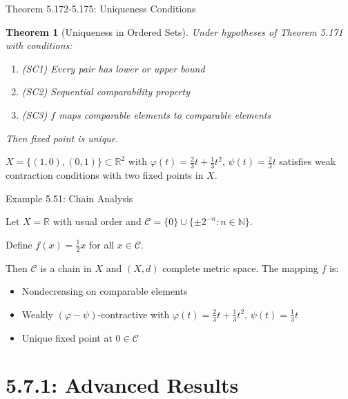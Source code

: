 \documentclass[aspectratio=169,10pt]{beamer}
\theoremstyle{plain}
\newtheorem*{theorem*}{Theorem}
\begin{document}
\begin{frame}{Theorem 5.172-5.175: Uniqueness Conditions}
  \begin{theorem*}[Uniqueness in Ordered Sets]
    Under hypotheses of Theorem 5.171 with conditions:
    \begin{enumerate}
      \item (SC1) Every pair has lower or upper bound
      \item (SC2) Sequential comparability property
      \item (SC3) $f$ maps comparable elements to comparable elements
    \end{enumerate}

    Then fixed point is unique.
  \end{theorem*}

  \vspace{1em}

  \begin{example*}
    $X = \{(1,0), (0,1)\} \subset \mathbb{R}^2$ with $\varphi(t) = \frac{2}{3}t + \frac{1}{3}t^2$,
    $\psi(t) = \frac{2}{3}t$ satisfies weak contraction conditions with two fixed points in $X$.
  \end{example*}
\end{frame}

\begin{frame}{Example 5.51: Chain Analysis}
  \begin{example*}
    Let $X = \mathbb{R}$ with usual order and $\mathcal{C} = \{0\} \cup \{\pm 2^{-n} : n \in \mathbb{N}\}$.

    Define $f(x) = \frac{1}{2}x$ for all $x \in \mathcal{C}$.

    Then $\mathcal{C}$ is a chain in $X$ and $(X,d)$ complete metric space. The mapping $f$ is:
    \begin{itemize}
      \item Nondecreasing on comparable elements
      \item Weakly $(\varphi - \psi)$-contractive with $\varphi(t) = \frac{2}{3}t + \frac{1}{3}t^2$,
            $\psi(t) = \frac{1}{3}t$
      \item Unique fixed point at $0 \in \mathcal{C}$
    \end{itemize}
  \end{example*}
\end{frame}

\section{5.7.1: Advanced Results}
\end{document}
